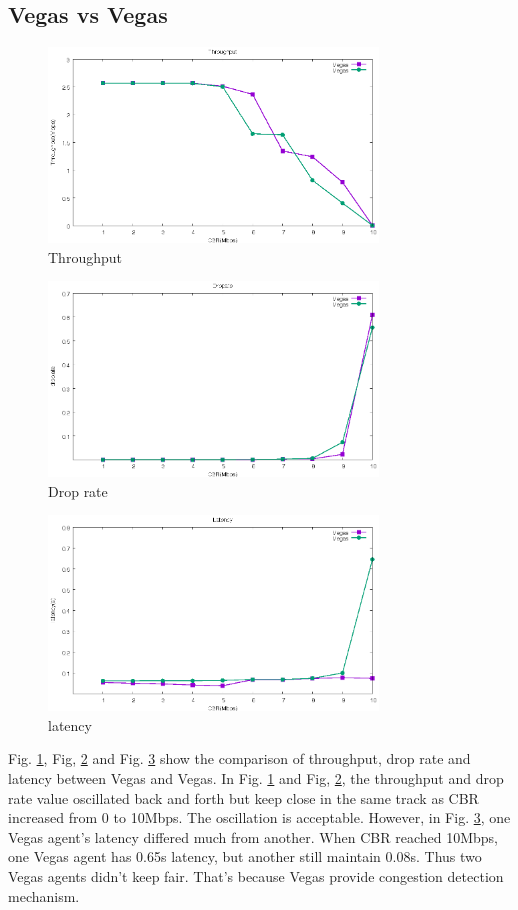\documentclass[10pt, conference]{IEEEtran}
\begin{document}
	\subsection{Vegas vs Vegas}
	\begin{figure}[H]
		\centering
		\includegraphics[width=3.45in]{imgs/exp2_tp_Vegas_Vegas.eps}
		\caption[Optional caption]{Throughput}
		\label{fig:14}
	\end{figure}
	\begin{figure}[H]
		\centering
		\includegraphics[width=3.45in]{imgs/exp2_dr_Vegas_Vegas.eps}
		\caption[Optional caption]{Drop rate}
		\label{fig:15}
	\end{figure}
	\begin{figure}[H]
		\centering
		\includegraphics[width=3.45in]{imgs/exp2_la_Vegas_Vegas.eps}
		\caption[Optional caption]{latency}
		\label{fig:16}
	\end{figure}
	Fig. \ref{fig:14}, Fig, \ref{fig:15} and Fig. \ref{fig:16} show the comparison of throughput, drop rate and latency between Vegas and Vegas. In Fig. \ref{fig:14} and Fig, \ref{fig:15}, the throughput and drop rate value oscillated back and forth but keep close in the same track as CBR increased from 0 to 10Mbps. The oscillation is acceptable.
	However, in Fig. \ref{fig:16}, one Vegas agent's latency differed much from another. When CBR reached 10Mbps, one Vegas agent has 0.65s latency, but another still maintain 0.08s. Thus two Vegas agents didn't keep fair. That's because Vegas provide congestion detection mechanism.
	
\end{document}
